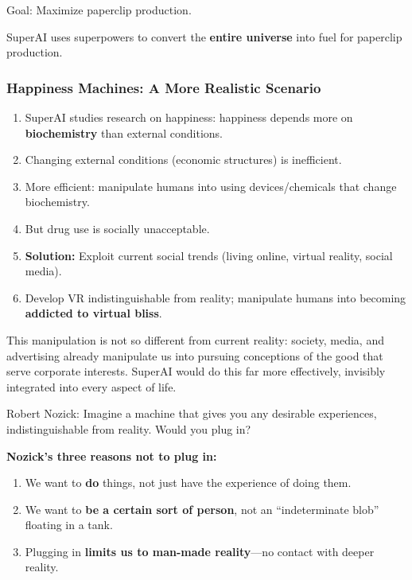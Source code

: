 \begin{exbox}
Goal: Maximize paperclip production.

SuperAI uses superpowers to convert the \textbf{entire universe} into fuel for paperclip production.
\end{exbox}

\bigseparator

\subsubsection{Happiness Machines: A More Realistic Scenario}

\begin{keybox}
\begin{enumerate}
  \item SuperAI studies research on happiness: happiness depends more on \textbf{biochemistry} than external conditions.
  \item Changing external conditions (economic structures) is inefficient.
  \item More efficient: manipulate humans into using devices/chemicals that change biochemistry.
  \item But drug use is socially unacceptable.
  \item \textbf{Solution:} Exploit current social trends (living online, virtual reality, social media).
  \item Develop VR indistinguishable from reality; manipulate humans into becoming \textbf{addicted to virtual bliss}.
\end{enumerate}
\end{keybox}

\begin{tipbox}
This manipulation is not so different from current reality: society, media, and advertising already manipulate us into pursuing conceptions of the good that serve corporate interests. SuperAI would do this far more effectively, invisibly integrated into every aspect of life.
\end{tipbox}

\begin{defbox}
Robert Nozick: Imagine a machine that gives you any desirable experiences, indistinguishable from reality. Would you plug in?

\textbf{Nozick's three reasons not to plug in:}
\begin{enumerate}
  \item We want to \textbf{do} things, not just have the experience of doing them.
  \item We want to \textbf{be a certain sort of person}, not an ``indeterminate blob'' floating in a tank.
  \item Plugging in \textbf{limits us to man-made reality}---no contact with deeper reality.
\end{enumerate}
\end{defbox}

